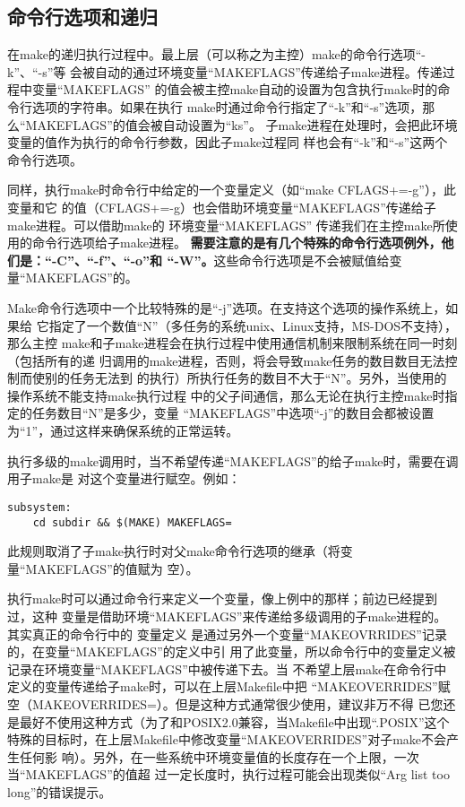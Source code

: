 \subsection{命令行选项和递归}
在make的递归执行过程中。最上层（可以称之为主控）make的命令行选项“-k”、“-s”等
会被自动的通过环境变量“MAKEFLAGS”传递给子make进程。传递过程中变量“MAKEFLAGS”
的值会被主控make自动的设置为包含执行make时的命令行选项的字符串。如果在执行
make时通过命令行指定了“-k”和“-s”选项，那么“MAKEFLAGS”的值会被自动设置为“ks”。
子make进程在处理时，会把此环境变量的值作为执行的命令行参数，因此子make过程同
样也会有“-k”和“-s”这两个命令行选项。

同样，执行make时命令行中给定的一个变量定义（如“make CFLAGS+=-g”），此变量和它
的值（CFLAGS+=-g）也会借助环境变量“MAKEFLAGS”传递给子make进程。可以借助make的
环境变量“MAKEFLAGS” 传递我们在主控make所使用的命令行选项给子make进程。%
\textbf{需要注意的是有几个特殊的命令行选项例外，他们是：“-C”、“-f”、“-o”和
“-W”。}这些命令行选项是不会被赋值给变量“MAKEFLAGS”的。

Make命令行选项中一个比较特殊的是“-j”选项。在支持这个选项的操作系统上，如果给
它指定了一个数值“N”（多任务的系统unix、Linux支持，MS-DOS不支持），那么主控
make和子make进程会在执行过程中使用通信机制来限制系统在同一时刻（包括所有的递
归调用的make进程，否则，将会导致make任务的数目数目无法控制而使别的任务无法到
的执行）所执行任务的数目不大于“N”。另外，当使用的操作系统不能支持make执行过程
中的父子间通信，那么无论在执行主控make时指定的任务数目“N”是多少，变量
“MAKEFLAGS”中选项“-j”的数目会都被设置为“1”，通过这样来确保系统的正常运转。

执行多级的make调用时，当不希望传递“MAKEFLAGS”的给子make时，需要在调用子make是
对这个变量进行赋空。例如：

\begin{Verbatim}[]
subsystem:
    cd subdir && $(MAKE) MAKEFLAGS=
\end{Verbatim}

\noindent
此规则取消了子make执行时对父make命令行选项的继承（将变量“MAKEFLAGS”的值赋为
空）。

执行make时可以通过命令行来定义一个变量，像上例中的那样；前边已经提到过，这种
变量是借助环境“MAKEFLAGS”来传递给多级调用的子make进程的。其实真正的命令行中的
变量定义 是通过另外一个变量“MAKEOVRRIDES”记录的，在变量“MAKEFLAGS”的定义中引
用了此变量，所以命令行中的变量定义被记录在环境变量“MAKEFLAGS”中被传递下去。当
不希望上层make在命令行中定义的变量传递给子make时，可以在上层Makefile中把
“MAKEOVERRIDES”赋空（MAKEOVERRIDES=）。但是这种方式通常很少使用，建议非万不得
已您还是最好不使用这种方式（为了和POSIX2.0兼容，当Makefile中出现“.POSIX”这个
特殊的目标时，在上层Makefile中修改变量“MAKEOVERRIDES”对子make不会产生任何影
响）。另外，在一些系统中环境变量值的长度存在一个上限，一次当“MAKEFLAGS”的值超
过一定长度时，执行过程可能会出现类似“Arg list too long”的错误提示。

